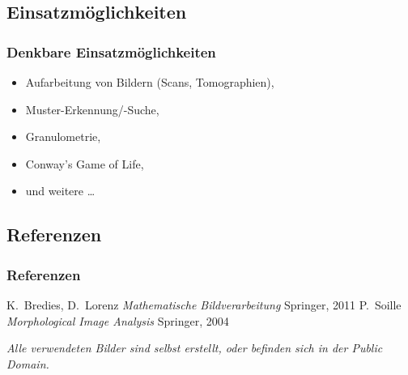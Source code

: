 \documentclass{beamer}
\begin{document}
\subsection{Einsatzmöglichkeiten}

\begin{frame}
    \frametitle{Denkbare Einsatzmöglichkeiten}
    \pause
    \begin{itemize}
        \item \pause
            Aufarbeitung von Bildern (Scans, Tomographien),
        \item \pause
            Muster-Erkennung/-Suche,
        \item \pause
            Granulometrie,
        \item \pause
            Conway's Game of Life,
        \item
            und weitere \dots
    \end{itemize}
\end{frame}

\subsection{Referenzen}

\begin{frame}
    \frametitle{Referenzen}
    \begin{thebibliography}{}
        K.~Bredies, D.~Lorenz
        \newblock \emph{Mathematische Bildverarbeitung}
        \newblock Springer, 2011
        P.~Soille
        \newblock \emph{Morphological Image Analysis}
        \newblock Springer, 2004
    \end{thebibliography}
    \par\vspace{1em}
    \emph{Alle verwendeten Bilder sind selbst erstellt, oder befinden sich in der Public Domain.}
\end{frame}
\end{document}
